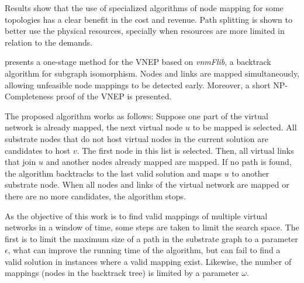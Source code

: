 Results show that the use of specialized algorithms of node mapping for some topologies has a clear benefit in the cost and revenue. Path splitting is shown to better use the physical resources, specially when resources are more limited in relation to the demands.



\citet{Lischka:2009} presents a one-stage method for the VNEP based on \emph{vnmFlib}, a backtrack algorithm for subgraph isomorphism.
Nodes and links are mapped simultaneously, allowing unfeasible node mappings to be detected early. Moreover, a short NP-Completeness proof of the VNEP is presented.


The proposed algorithm works as follows: Suppose one part of the virtual network is already mapped, the next virtual node $u$ to be mapped is selected. All substrate nodes that do not host virtual nodes in the current solution are candidates to host $v$. The first node in this list is selected. Then, all virtual links that join $u$ and another nodes already mapped are mapped. If no path is found, the algorithm backtracks to the last valid solution and maps $u$ to another substrate node. When all nodes and links of the virtual network are mapped or there are no more candidates, the algorithm stops.

As the objective of this work is to find valid mappings of multiple virtual networks in a window of time, some steps are taken to limit the search space. The first is to limit the maximum size of a path in the substrate graph to a parameter $\epsilon$, what can improve the running time of the algorithm, but can fail to find a valid solution in instances where a valid mapping exist. Likewise, the number of mappings (nodes in the backtrack tree) is limited by a parameter $\omega$.


